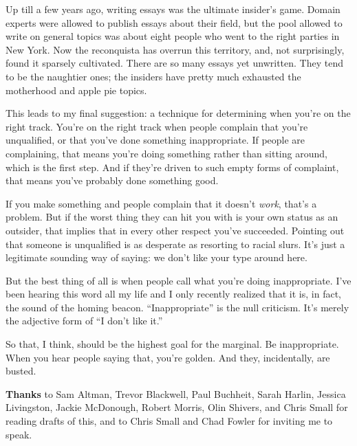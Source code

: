 Up till a few years ago, writing essays was the ultimate insider's game.
Domain experts were allowed to publish essays about their field, but the
pool allowed to write on general topics was about eight people who went
to the right parties in New York. Now the reconquista has overrun this
territory, and, not surprisingly, found it sparsely cultivated. There
are so many essays yet unwritten. They tend to be the naughtier ones;
the insiders have pretty much exhausted the motherhood and apple pie
topics.

This leads to my final suggestion: a technique for determining when
you're on the right track. You're on the right track when people
complain that you're unqualified, or that you've done something
inappropriate. If people are complaining, that means you're doing
something rather than sitting around, which is the first step. And if
they're driven to such empty forms of complaint, that means you've
probably done something good.

If you make something and people complain that it doesn't \emph{work},
that's a problem. But if the worst thing they can hit you with is your
own status as an outsider, that implies that in every other respect
you've succeeded. Pointing out that someone is unqualified is as
desperate as resorting to racial slurs. It's just a legitimate sounding
way of saying: we don't like your type around here.

But the best thing of all is when people call what you're doing
inappropriate. I've been hearing this word all my life and I only
recently realized that it is, in fact, the sound of the homing beacon.
``Inappropriate'' is the null criticism. It's merely the adjective form
of ``I don't like it.''

So that, I think, should be the highest goal for the marginal. Be
inappropriate. When you hear people saying that, you're golden. And
they, incidentally, are busted.


\textbf{Thanks} to Sam Altman, Trevor Blackwell, Paul Buchheit, Sarah
Harlin, Jessica Livingston, Jackie McDonough, Robert Morris, Olin
Shivers, and Chris Small for reading drafts of this, and to Chris Small
and Chad Fowler for inviting me to speak.